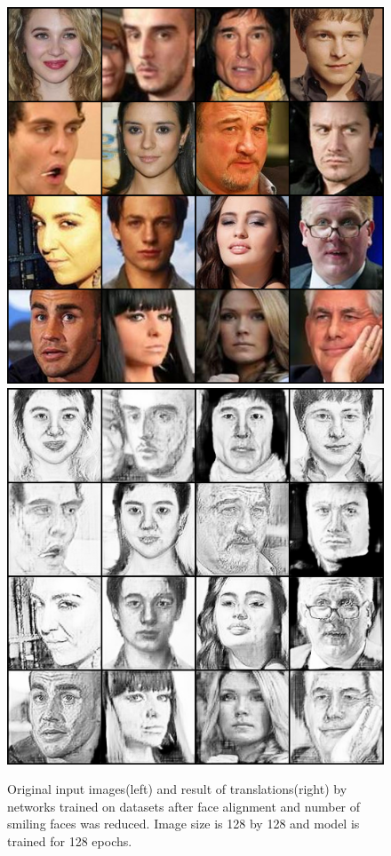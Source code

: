 \begin{figure}[ht]
\begin{center}
    \includegraphics[scale=0.32]{Graphics/pic2ske_origin_final.png}
    \includegraphics[scale=0.32]{Graphics/pic2ske_result_final.png}
    \end{center}
    \caption{Original input images(left) and result of translations(right) by networks trained on datasets after face alignment and number of smiling faces was reduced. Image size is 128 by 128 and model is trained for 128 epochs.}\label{FIG:final}
\end{figure}



\endinput
